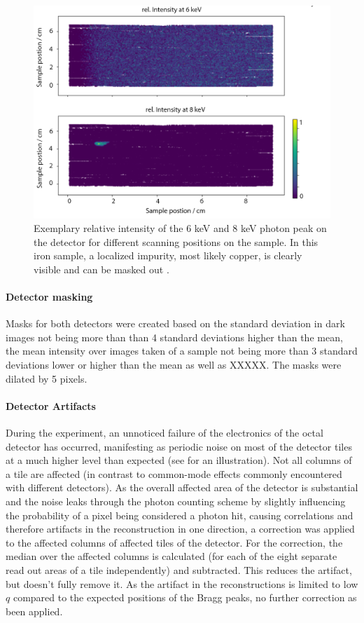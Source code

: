 \begin{figure}
	\centering
	\includegraphics[width=0.7\linewidth]{images/xrf.png}
	\caption[Exemplary relative intensity of the 6 keV and 8 keV photon peak on the detector for different scanning positions on the sample]{Exemplary relative intensity of the 6 keV and 8 keV photon peak on the detector for different scanning positions on the sample. In this iron sample, a localized impurity, most likely copper, is clearly visible and can be masked out .}
	\label{fig:xrf}
\end{figure}

\paragraph{Detector masking}
Masks for both detectors were created based on the standard deviation in dark images not being more than than 4 standard deviations higher than the mean, the mean intensity over images taken of a sample not being more than 3 standard deviations lower or higher than the mean as well as XXXXX.
The masks were dilated by 5 pixels.

\paragraph{Detector Artifacts}
During the experiment, an unnoticed failure of the electronics of the octal detector has occurred, manifesting as periodic noise on most of the detector tiles at a much higher level than expected (see  for an illustration). Not all columns of a tile are affected (in contrast to common-mode effects commonly encountered with different detectors). As the overall affected area of the detector is substantial and the noise leaks through the photon counting scheme by slightly influencing the probability of a pixel being considered a photon hit, causing correlations and therefore artifacts in the reconstruction in one direction, a correction was applied to the affected columns of affected tiles of the detector. For the correction, the median over the affected columns is calculated (for each of the eight separate read out areas of a tile independently) and subtracted. This reduces the artifact, but doesn't fully remove it. As the artifact in the reconstructions is limited to low $q$ compared to the expected positions of the Bragg peaks, no further correction as been applied.





